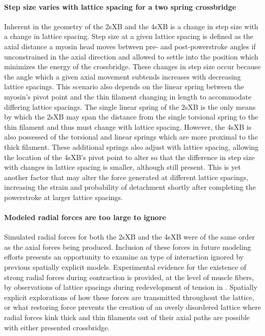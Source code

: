 \documentclass[]{article}
\begin{document}
\paragraph{Step size varies with lattice spacing for a two spring crossbridge} %
Inherent in the geometry of the 2sXB and the 4sXB is a change in step size with a change in lattice spacing.
Step size at a given lattice spacing is defined as the axial distance a myosin head moves between pre- and post-powerstroke angles if unconstrained in the axial direction and allowed to settle into the position which minimizes the energy of the crossbridge.
These changes in step size occur because the angle which a given axial movement subtends increases with decreasing lattice spacings.
This scenario also depends on the linear spring between the myosin's pivot point and the thin filament changing in length to accommodate differing lattice spacings.
The single linear spring of the 2sXB is the only means by which the 2sXB may span the distance from the single torsional spring to the thin filament and thus must change with lattice spacing.
However, the 4sXB is also possessed of the torsional and linear springs which are more proximal to the thick filament.
These additional springs also adjust with lattice spacing, allowing the location of the 4sXB's pivot point to alter so that the difference in step size with changes in lattice spacing is smaller, although still present.
This is yet another factor that may alter the force generated at different lattice spacings, increasing the strain and probability of detachment shortly after completing the powerstroke at larger lattice spacings.

\paragraph{Modeled radial forces are too large to ignore} %
Simulated radial forces for both the 2sXB and the 4sXB were of the same order as the axial forces being produced. 
Inclusion of these forces in future modeling efforts presents an opportunity to examine an type of interaction ignored by previous spatially explicit models.
Experimental evidence for the existence of strong radial forces during contraction is provided, at the level of muscle fibers, by observations of lattice spacings during redevelopment of tension in \citet{Cecchi:1990p2763}.
Spatially explicit explorations of how these forces are transmitted throughout the lattice, or what restoring force prevents the creation of an overly disordered lattice where radial forces kink thick and thin filaments out of their axial paths are possible with either presented crossbridge.
\end{document}
